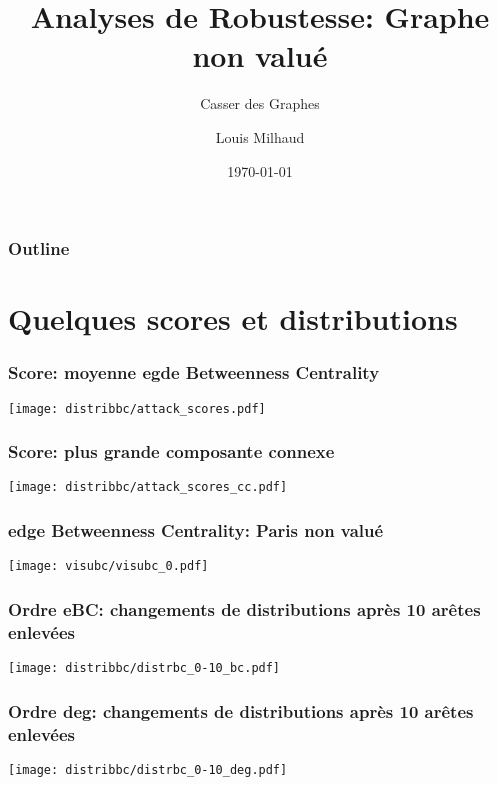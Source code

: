 \documentclass[aspectratio=169]{beamer}
\title{Analyses de Robustesse: Graphe non valué}
\subtitle{Casser des Graphes}
\author{Louis Milhaud}
\institute{Complex Networks - LIP6}
\date{\today}
\begin{document}
    \begin{frame}
        \titlepage
    \end{frame}

    \begin{frame}
        \frametitle{Outline}
        \tableofcontents
    \end{frame}

    \section{Quelques scores et distributions}

    \begin{frame}
        \frametitle{Score: moyenne egde Betweenness Centrality}
        \centering
        \texttt{[image: distribbc/attack\_scores.pdf]}
    \end{frame}

    \begin{frame}
        \frametitle{Score: plus grande composante connexe}
        \centering
        \texttt{[image: distribbc/attack\_scores\_cc.pdf]}
    \end{frame}

    \begin{frame}
        \frametitle{edge Betweenness Centrality: Paris non valué}
        \centering
        \texttt{[image: visubc/visubc\_0.pdf]}
    \end{frame}

    \begin{frame}
        \frametitle{Ordre eBC: changements de distributions après 10 arêtes enlevées}
        \centering
        \texttt{[image: distribbc/distrbc\_0-10\_bc.pdf]}    
    \end{frame}

    \begin{frame}
        \frametitle{Ordre deg: changements de distributions après 10 arêtes enlevées}
        \centering
        \texttt{[image: distribbc/distrbc\_0-10\_deg.pdf]}    
    \end{frame}
\end{document}
